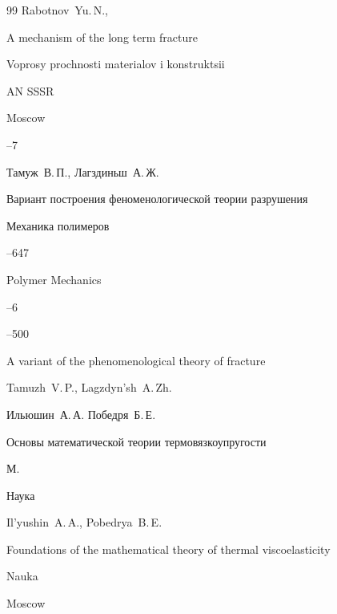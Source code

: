 \begin{thebibliography}{99}
\by Rabotnov~Yu.\,N., 

\paper A mechanism of the long term fracture

\inbook Voprosy prochnosti materialov i konstruktsii

\publ AN SSSR

\publaddr Moscow

–7







\by Тамуж~В.\,П., Лагздиньш~А.\,Ж.

\paper Вариант построения феноменологической теории разрушения

\jour Механика полимеров




--647

\transl

\jour Polymer Mechanics



--6

--500

\paper A variant of the phenomenological theory of fracture

\by Tamuzh~V.\,P., Lagz\-dyn'sh~A.\,Zh. 





\by Ильюшин~А.\,А. Победря~Б.\,Е.

\book Основы математической теории термовязкоупругости

\publaddr М.

\publ Наука



\misctransl

\by Il'yushin~A.\,A., Pobedrya~B.\,E.

\book Foundations of the mathematical theory of thermal viscoelasticity

\publ Nauka

\publaddr Moscow






\end{thebibliography}
